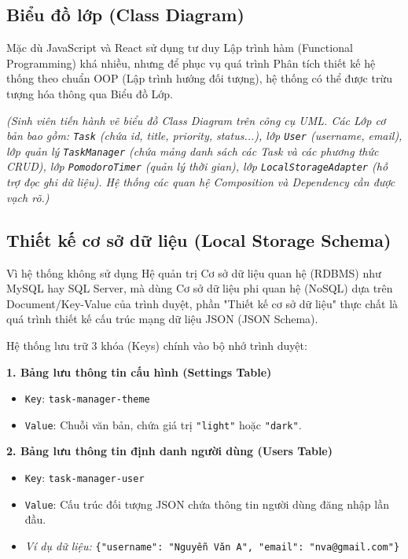 \subsection{Biểu đồ lớp (Class Diagram)}
Mặc dù JavaScript và React sử dụng tư duy Lập trình hàm (Functional Programming) khá nhiều, nhưng để phục vụ quá trình Phân tích thiết kế hệ thống theo chuẩn OOP (Lập trình hướng đối tượng), hệ thống có thể được trừu tượng hóa thông qua Biểu đồ Lớp.

\textit{(Sinh viên tiến hành vẽ biểu đồ Class Diagram trên công cụ UML. Các Lớp cơ bản bao gồm: \texttt{Task} (chứa id, title, priority, status...), lớp \texttt{User} (username, email), lớp quản lý \texttt{TaskManager} (chứa mảng danh sách các Task và các phương thức CRUD), lớp \texttt{PomodoroTimer} (quản lý thời gian), lớp \texttt{LocalStorageAdapter} (hỗ trợ đọc ghi dữ liệu). Hệ thống các quan hệ Composition và Dependency cần được vạch rõ.)}

\subsection{Thiết kế cơ sở dữ liệu (Local Storage Schema)}
Vì hệ thống không sử dụng Hệ quản trị Cơ sở dữ liệu quan hệ (RDBMS) như MySQL hay SQL Server, mà dùng Cơ sở dữ liệu phi quan hệ (NoSQL) dựa trên Document/Key-Value của trình duyệt, phần "Thiết kế cơ sở dữ liệu" thực chất là quá trình thiết kế cấu trúc mạng dữ liệu JSON (JSON Schema).

Hệ thống lưu trữ 3 khóa (Keys) chính vào bộ nhớ trình duyệt:

\textbf{1. Bảng lưu thông tin cấu hình (Settings Table)}
\begin{itemize}
    \item \texttt{Key}: \texttt{task-manager-theme}
    \item \texttt{Value}: Chuỗi văn bản, chứa giá trị \texttt{"light"} hoặc \texttt{"dark"}.
\end{itemize}

\textbf{2. Bảng lưu thông tin định danh người dùng (Users Table)}
\begin{itemize}
    \item \texttt{Key}: \texttt{task-manager-user}
    \item \texttt{Value}: Cấu trúc đối tượng JSON chứa thông tin người dùng đăng nhập lần đầu.
    \item \textit{Ví dụ dữ liệu:} \texttt{\{"username": "Nguyễn Văn A", "email": "nva@gmail.com"\}}
\end{itemize}

